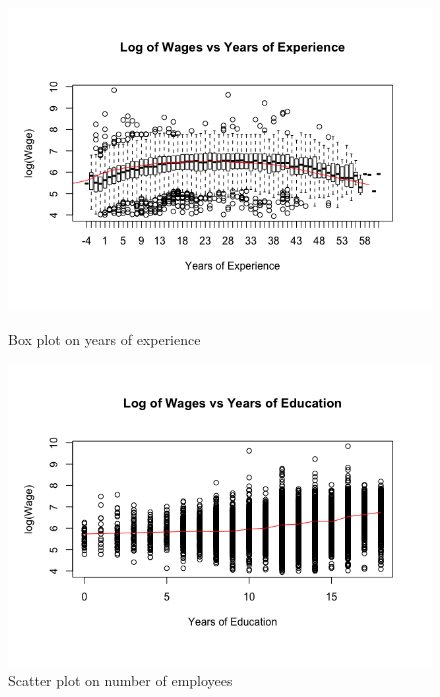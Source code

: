 \documentclass{article}
\begin{document}
\begin{figure}
\begin{minipage}{.45\textwidth}
          \includegraphics[scale=0.35]{transformation/boxexp}
          \caption{Box plot on years of experience}
          \label{fig:boxexp}
        \end{minipage}
        \begin{minipage}{.45\textwidth}
          \centering
          \includegraphics[scale=0.35]{transformation/scatteredu}
          \caption{Scatter plot on number of employees}
          \label{fig:scatteredu}


\end{minipage}
\end{figure}
\end{document}
